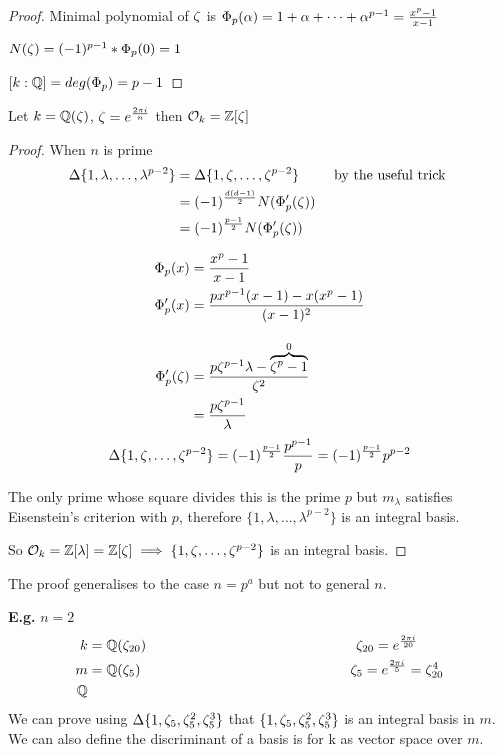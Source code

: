 \documentclass[11pt]{article}
\begin{document}
\begin{proof}
	Minimal polynomial of $\zeta$ is $\Phi_p(\alpha) = 1 + \alpha + \dots + \alpha^{p-1} = \frac{x^p -1}{x-1}$

	$N(\zeta) = (-1)^{p-1} * \Phi_p(0) = 1$
\spa
	
	$[k:\mathbb{Q}] = deg(\Phi_p) = p-1$
\end{proof}


\begin{theorem}
	Let $k = \mathbb{Q}(\zeta) $, $\zeta  = e^{\frac{2 \pi i}{n}}$ then $\mathcal{O}_k = \mathbb{Z}[\zeta]$
\end{theorem}
\begin{proof}
When $n$ is prime 
	\begin{align*}
		\Delta \{1, \lambda, \dots, \lambda^{p-2} \} &= \Delta \{ 1, \zeta, \dots, \zeta^{p-2} \}  &\text{ by the useful trick }\\
		& = (-1) ^{\frac{d(d-1)}{2}} N(\Phi'_p(\zeta))\\
		& = (-1) ^{\frac{p-1}{2}} N(\Phi'_p(\zeta))
	\end{align*}

	\begin{align*}
		\Phi_p(x) &= \frac{x^p-1}{x-1}\\
		\Phi_p'(x)&= \frac{px^{p-1}(x-1) - x(x^p-1)}{(x-1)^2} \\[1em]
		\Phi_p'(\zeta) &= \frac{p\zeta^{p-1} \lambda - \overbrace{\zeta^p - 1}^{0}}{\zeta^2} \\
		&= \frac{p\zeta^{p-1}}{\lambda}
	\end{align*}
	\begin{align*}
		\Delta\{1, \zeta, \dots, \zeta^{p-2} \} = (-1) ^{\frac{p-1}{2}} \frac{p^{p-1}}p = (-1)^{\frac{p-1}2} p^{p-2}
	\end{align*}

	The only prime whose square divides this is the prime $p$ but $m_\lambda$ satisfies Eisenstein's criterion with $p$, therefore $\{1, \lambda, \dots, \lambda^{p-2} \}$  is an integral basis.

	So $\mathcal{O}_k = \mathbb{Z}[\lambda]  = \mathbb{Z}[\zeta] \implies \{1, \zeta, \dots, \zeta^{p-2} \}$ is an integral basis.
\end{proof}
\spa
The proof generalises to the case $n=p^a$ but not to general $n$.

\spa
\textbf{E.g.} $n=2$ 
\begin{align*}
	k &=\Q(\z_{20}) \hspace{150pt} \z_{20} = e^{\frac{2\pi i }{20}}\\
	 m&=\Q(\z_5) \hspace{150pt} \z_5 =e^{\frac{2 \pi i}{5}} = \z^4_{20}\\
	 \Q&
\end{align*}
We can prove using $\Delta \{1, \zeta_5, \zeta_5^2, \zeta_5^3 \}$ that $\{ 1, \zeta_5, \zeta_5^2, \zeta_5^3 \}$ is an integral basis in $m$. 
We can also define the discriminant of a basis is for k as vector space over $m$.
\end{document}
